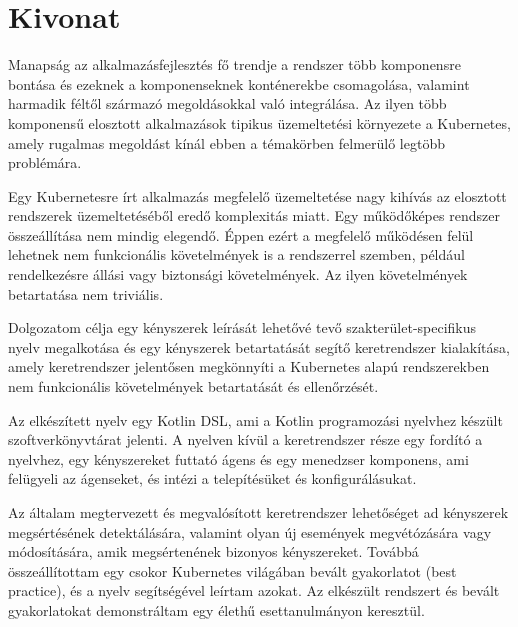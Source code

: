 \setcounter{page}{1}

\selecthungarian

\setlength{\parindent}{0pt}
\setlength{\parskip}{0.6em}

\chapter*{Kivonat}

Manapság az alkalmazásfejlesztés fő trendje a rendszer több komponensre bontása és ezeknek a komponenseknek konténerekbe csomagolása, valamint harmadik féltől származó megoldásokkal való integrálása. Az ilyen több komponensű elosztott alkalmazások tipikus üzemeltetési környezete a Kubernetes, amely rugalmas megoldást kínál ebben a témakörben felmerülő legtöbb problémára.

Egy Kubernetesre írt alkalmazás megfelelő üzemeltetése nagy kihívás az elosztott rendszerek üzemeltetéséből eredő komplexitás miatt. Egy működőképes rendszer összeállítása nem mindig elegendő. Éppen ezért a megfelelő működésen felül lehetnek nem funkcionális követelmények is a rendszerrel szemben, például rendelkezésre állási vagy biztonsági követelmények. Az ilyen követelmények betartatása nem triviális.

Dolgozatom célja egy kényszerek leírását lehetővé tevő szakterület-specifikus nyelv megalkotása és egy kényszerek betartatását segítő keretrendszer kialakítása, amely keretrendszer jelentősen megkönnyíti a Kubernetes alapú rendszerekben nem funkcionális követelmények betartatását és ellenőrzését.

Az elkészített nyelv egy Kotlin DSL, ami a Kotlin programozási nyelvhez készült szoftverkönyvtárat jelenti. A nyelven kívül a keretrendszer része egy fordító a nyelvhez, egy kényszereket futtató ágens és egy menedzser komponens, ami felügyeli az ágenseket, és intézi a telepítésüket és konfigurálásukat.

Az általam megtervezett és megvalósított keretrendszer lehetőséget ad kényszerek megsértésének detektálására, valamint olyan új események megvétózására vagy módosítására, amik megsértenének bizonyos kényszereket. Továbbá összeállítottam egy csokor Kubernetes világában bevált gyakorlatot (best practice), és a nyelv segítségével leírtam azokat. Az elkészült rendszert és bevált gyakorlatokat demonstráltam egy élethű esettanulmányon keresztül.

